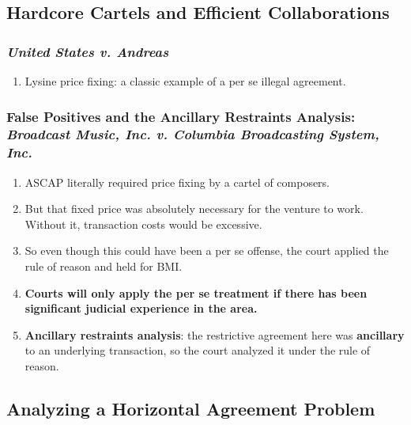 \subsection{Hardcore Cartels and Efficient Collaborations}

\subsubsection{\emph{United States v. Andreas}}

\begin{enumerate}
    \item Lysine price fixing: a classic example of a per se illegal agreement.
\end{enumerate}

\subsubsection{False Positives and the Ancillary Restraints Analysis: 
\emph{Broadcast Music, Inc. v. Columbia Broadcasting System, Inc.}}

\begin{enumerate}
    \item ASCAP literally required price fixing by a cartel of composers.
    \item But that fixed price was absolutely necessary for the venture to work.  
    Without it, transaction costs would be excessive.
    \item So even though this could have been a per se offense, the court 
    applied the rule of reason and held for BMI.
    \item \textbf{Courts will only apply the per se treatment if there has been 
    significant judicial experience in the area.}
    \item \textbf{Ancillary restraints analysis}: the restrictive agreement here 
    was \textbf{ancillary} to an underlying transaction, so the court analyzed 
    it under the rule of reason.
\end{enumerate}

\subsection{Analyzing a Horizontal Agreement Problem}

